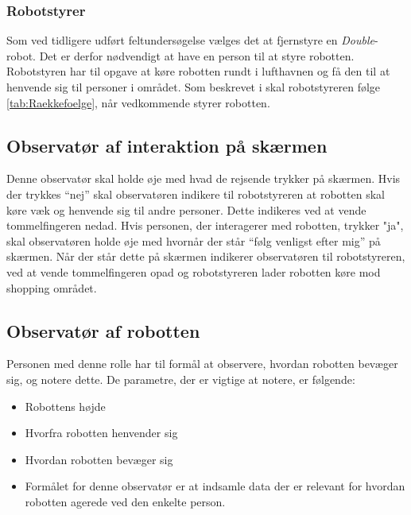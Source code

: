\subsubsection*{Robotstyrer}
Som ved tidligere udført feltundersøgelse vælges det at fjernstyre en \textit{Double}-robot. Det er derfor nødvendigt at have en person til at styre robotten. \blankline
%
Robotstyren har til opgave at køre robotten rundt i lufthavnen og få den til at henvende sig til personer i området. Som beskrevet i  skal robotstyreren følge \autoref{tab:Raekkefoelge}, når vedkommende styrer robotten.

\subsection{Observatør af interaktion på skærmen}
Denne observatør skal holde øje med hvad de rejsende trykker på skærmen. Hvis der trykkes “nej” skal observatøren indikere til robotstyreren at robotten skal køre væk og henvende sig til andre personer. Dette indikeres ved at vende tommelfingeren nedad. 
Hvis personen, der interagerer med robotten, trykker "ja", skal observatøren holde øje med hvornår der står “følg venligst efter mig” på skærmen. Når der står dette på skærmen indikerer observatøren til robotstyreren, ved at vende tommelfingeren opad og robotstyreren lader robotten køre mod shopping området. 

\subsection{Observatør af robotten}
Personen med denne rolle har til formål at observere, hvordan robotten bevæger sig, og notere dette. De parametre, der er vigtige at notere, er følgende: 
%
\begin{itemize}
	\item Robottens højde
	\item Hvorfra robotten henvender sig
	\item Hvordan robotten bevæger sig 
	\item Formålet for denne observatør er at indsamle data der er relevant for hvordan robotten agerede ved den enkelte person. 
\end{itemize}
%
